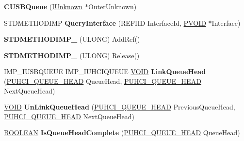 \begin{DoxyCompactItemize}
{\bfseries C\+U\+S\+B\+Queue} (\hyperlink{interface_i_unknown}{I\+Unknown} $\ast$Outer\+Unknown)
\item 
\mbox{\label{class_c_u_s_b_queue_a84151b9419ed4c3af460701e69c541c6}} 
S\+T\+D\+M\+E\+T\+H\+O\+D\+I\+MP {\bfseries Query\+Interface} (R\+E\+F\+I\+ID Interface\+Id, \hyperlink{interfacevoid}{P\+V\+O\+ID} $\ast$Interface)
\item 
\mbox{\label{class_c_u_s_b_queue_abda1e16a6620fb1e76e2154ecdaae358}} 
{\bfseries S\+T\+D\+M\+E\+T\+H\+O\+D\+I\+M\+P\+\_\+} (U\+L\+O\+NG) Add\+Ref()
\item 
\mbox{\label{class_c_u_s_b_queue_a36bec2580946a080066f59ff48ac67cb}} 
{\bfseries S\+T\+D\+M\+E\+T\+H\+O\+D\+I\+M\+P\+\_\+} (U\+L\+O\+NG) Release()
\item 
\mbox{\label{class_c_u_s_b_queue_a13fdf423bbdcd3142f20ae4531fbff48}} 
I\+M\+P\+\_\+\+I\+U\+S\+B\+Q\+U\+E\+UE I\+M\+P\+\_\+\+I\+U\+H\+C\+I\+Q\+U\+E\+UE \hyperlink{interfacevoid}{V\+O\+ID} {\bfseries Link\+Queue\+Head} (\hyperlink{struct___u_h_c_i___q_u_e_u_e___h_e_a_d}{P\+U\+H\+C\+I\+\_\+\+Q\+U\+E\+U\+E\+\_\+\+H\+E\+AD} Queue\+Head, \hyperlink{struct___u_h_c_i___q_u_e_u_e___h_e_a_d}{P\+U\+H\+C\+I\+\_\+\+Q\+U\+E\+U\+E\+\_\+\+H\+E\+AD} Next\+Queue\+Head)
\item 
\mbox{\label{class_c_u_s_b_queue_a318b3740b30d0f4d977f01627eb0bfda}} 
\hyperlink{interfacevoid}{V\+O\+ID} {\bfseries Un\+Link\+Queue\+Head} (\hyperlink{struct___u_h_c_i___q_u_e_u_e___h_e_a_d}{P\+U\+H\+C\+I\+\_\+\+Q\+U\+E\+U\+E\+\_\+\+H\+E\+AD} Previous\+Queue\+Head, \hyperlink{struct___u_h_c_i___q_u_e_u_e___h_e_a_d}{P\+U\+H\+C\+I\+\_\+\+Q\+U\+E\+U\+E\+\_\+\+H\+E\+AD} Next\+Queue\+Head)
\item 
\mbox{\label{class_c_u_s_b_queue_abe5dc69aa04e7aecb425b60010b71dc1}} 
\hyperlink{_processor_bind_8h_a112e3146cb38b6ee95e64d85842e380a}{B\+O\+O\+L\+E\+AN} {\bfseries Is\+Queue\+Head\+Complete} (\hyperlink{struct___u_h_c_i___q_u_e_u_e___h_e_a_d}{P\+U\+H\+C\+I\+\_\+\+Q\+U\+E\+U\+E\+\_\+\+H\+E\+AD} Queue\+Head)
\item 
\mbox{\label{class_c_u_s_b_queue_a5b080646c56b33bb98db785ff2e59dbf}} 

\end{DoxyCompactItemize}
